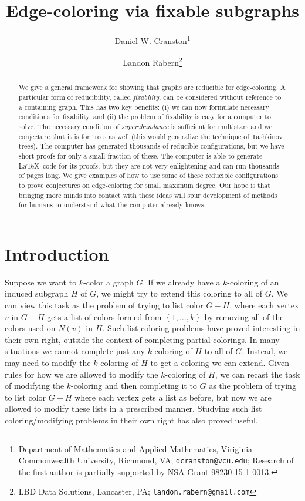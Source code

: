 \documentclass[12pt]{article}
\theoremstyle{plain}
\theoremstyle{definition}
\theoremstyle{remark}
\newcommand{\set}[1]{\left\{ #1 \right\}}
\begin{document}
\title{Edge-coloring via fixable subgraphs}
\author{Daniel W. Cranston\thanks{Department of Mathematics and Applied
Mathematics, Viriginia Commonwealth University, Richmond, VA;
\texttt{dcranston@vcu.edu}; 
Research of the first author is partially supported by NSA Grant
98230-15-1-0013.}
\and
Landon Rabern\thanks{LBD Data Solutions, Lancaster, PA;
\texttt{landon.rabern@gmail.com}}
}
\maketitle

\begin{abstract}
We give a general framework for showing that graphs are reducible for edge-coloring.  A particular form of reducibility, called \emph{fixability}, can be considered without reference to a containing graph.  This has two key benefits: (i) we can now formulate necessary conditions for fixability, and (ii) the problem of fixability is easy for a computer to solve. The necessary condition of \emph{superabundance} is sufficient for multistars and we conjecture that it is for trees as well (this would generalize the technique of Tashkinov trees). The computer has generated thousands of reducible configurations, but we have short proofs for only a small fraction of these.  The computer is able to generate \LaTeX\ code for its proofs, but they are not very enlightening and can run thousands of pages long.  We give examples of how to use some of these reducible configurations to prove conjectures on edge-coloring for small maximum degree.  Our hope is that bringing more minds into contact with these ideas will spur development of methods for humans to understand what the computer already knows.
\end{abstract}

\section{Introduction}
Suppose we want to $k$-color a graph $G$. If we already have a $k$-coloring of
an induced subgraph $H$ of $G$, we might try to extend this coloring to all of
$G$.  We can view this task as the problem of trying to list color $G-H$, where
each vertex $v$ in $G-H$ gets a list of colors formed from $\set{1, \ldots, k}$
by removing all of the colors used on $N(v)$ in $H$.  
Such list coloring problems have proved interesting in their own right, outside the
context of completing partial colorings.
In many situations we cannot complete just any $k$-coloring of $H$ to all of
$G$.  Instead, we may need to modify the $k$-coloring of $H$ to get a coloring
we can extend.  Given rules for how we are allowed to modify the $k$-coloring
of $H$, we can recast the task of modifying the $k$-coloring and then
completing it to $G$ as the problem of trying to list color $G-H$ where each
vertex gets a list as before, but now we are allowed to modify these lists in a
prescribed manner.  Studying such list coloring/modifying problems in their own
right has also proved useful.  
\end{document}
